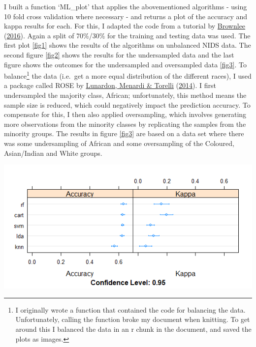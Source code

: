 \documentclass[11pt,preprint, authoryear]{elsarticle}
\let\origfigure\figure
\let\endorigfigure\endfigure
\renewenvironment{figure}[1][2] {
    \expandafter\origfigure\expandafter[H]
} {
    \endorigfigure
}
\numberwithin{equation}{section}
\numberwithin{figure}{section}
\numberwithin{table}{section}
\let\rmarkdownfootnote\footnote%
\def\footnote{\protect\rmarkdownfootnote}
\begin{document}
I built a function `ML\_plot' that applies the abovementioned algorithms
- using 10 fold cross validation where necessary - and returns a plot of
the accuracy and kappa results for each. For this, I adapted the code
from a tutorial by \protect\hyperlink{ref-ml}{Brownlee}
(\protect\hyperlink{ref-ml}{2016}). Again a split of 70\%/30\% for the
training and testing data was used. The first plot \ref{fig1} shows the
results of the algorithms on unbalanced NIDS data. The second figure
\ref{fig2} shows the results for the undersampled data and the last
figure shows the outcomes for the undersampled and oversampled data
\ref{fig3}. To balance\footnote{I originally wrote a function that
  contained the code for balancing the data. Unfortunately, calling the
  function broke my document when knitting. To get around this I
  balanced the data in an r chunk in the document, and saved the plots
  as images.} the data (i.e.~get a more equal distribution of the
different races), I used a package called ROSE by
\protect\hyperlink{ref-rose}{Lunardon, Menardi \& Torelli}
(\protect\hyperlink{ref-rose}{2014}). I first undersampled the majority
class, African; unfortunately, this method means the sample size is
reduced, which could negatively impact the prediction accuracy. To
compensate for this, I then also applied oversampling, which involves
generating more observations from the minority classes by replicating
the samples from the minority groups. The results in figure \ref{fig3}
are based on a data set where there was some undersampling of African
and some oversampling of the Coloured, Asian/Indian and White groups.

\begin{figure}[htbp]
\centering
\includegraphics{images/unbal.png}
\caption{Machine Learning applied to unbalanced data \label{fig1}}
\end{figure}
\end{document}
